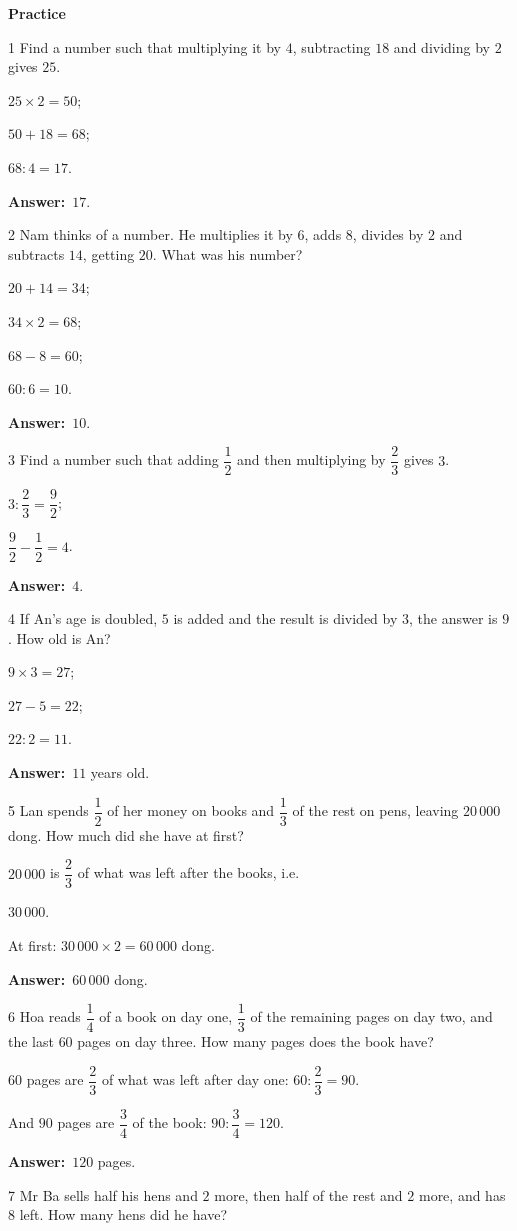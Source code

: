 \documentclass[11pt]{article}
\newif\ifsol \solfalse
\providecommand{\AnsWord}{Đáp số}
\newcommand{\dapso}[1]{\par\textbf{\AnsWord:}\ #1}
\newcommand{\probsol}[1]{%
  \begin{lrbox}{\solmeasure}\begin{minipage}{\dimexpr\linewidth-24pt\relax}#1\end{minipage}\end{lrbox}%
  \ifsol
    \begin{solbox}#1\end{solbox}%
  \else
    \setlength{\solht}{\dimexpr\ht\solmeasure+\dp\solmeasure+0.85cm\relax}%
    \ifdim\solht<1.35cm\setlength{\solht}{1.35cm}\fi
    \begin{tcolorbox}[colback=white,colframe=Line,boxrule=0.8pt,arc=5pt,
      left=8pt,right=8pt,top=4pt,bottom=4pt,height=\solht]{\footnotesize\color{Slate}\itshape\WorkWord}\end{tcolorbox}%
  \fi}
\newcommand{\dividerbar}[1]{\par\vspace{0.6em}\noindent
  \begin{tcolorbox}[enhanced,frame hidden,interior hidden,borderline west={5pt}{0pt}{ProbBlue},
    colback=white,left=12pt,right=12pt,top=5pt,bottom=5pt,arc=4pt]
  {\large\bfseries\color{ProbBlue} #1}\end{tcolorbox}\vspace{0.4em}}
\newcommand{\gap}{\vspace{0.3cm}}
\def\WorkWord{Your work:}
\def\AnsWord{Answer}
\begin{document}
\dividerbar{Practice}
\begin{probbox}{1}{\relax}
Find a number such that multiplying it by $4$, subtracting $18$ and dividing by $2$ gives $25$.
\end{probbox}
\probsol{
$25\times2=50$;\par $50+18=68$;\par $68:4=17$.
\dapso{$17$.}}
\gap
\begin{probbox}{2}{\relax}
Nam thinks of a number. He multiplies it by $6$, adds $8$, divides by $2$ and subtracts $14$, getting $20$. What was his number?
\end{probbox}
\probsol{
$20+14=34$;\par $34\times2=68$;\par $68-8=60$;\par $60:6=10$.
\dapso{$10$.}}
\gap
\begin{probbox}{3}{\relax}
Find a number such that adding $\dfrac12$ and then multiplying by $\dfrac23$ gives $3$.
\end{probbox}
\probsol{
$3:\dfrac23=\dfrac92$;\par $\dfrac92-\dfrac12=4$.
\dapso{$4$.}}
\gap
\begin{probbox}{4}{\relax}
If An's age is doubled, $5$ is added and the result is divided by $3$, the answer is $9$. How old is An?
\end{probbox}
\probsol{
$9\times3=27$;\par $27-5=22$;\par $22:2=11$.
\dapso{$11$ years old.}}
\gap
\begin{probbox}{5}{\relax}
Lan spends $\dfrac12$ of her money on books and $\dfrac13$ of the rest on pens, leaving $20\,000$ dong. How much did she have at first?
\end{probbox}
\probsol{
$20\,000$ is $\dfrac23$ of what was left after the books, i.e.\par $30\,000$.\par At first: $30\,000\times2=60\,000$ dong.
\dapso{$60\,000$ dong.}}
\gap
\begin{probbox}{6}{\relax}
Hoa reads $\dfrac14$ of a book on day one, $\dfrac13$ of the remaining pages on day two, and the last $60$ pages on day three. How many pages does the book have?
\end{probbox}
\probsol{
$60$ pages are $\dfrac23$ of what was left after day one: $60:\dfrac23=90$.\par And $90$ pages are $\dfrac34$ of the book: $90:\dfrac34=120$.
\dapso{$120$ pages.}}
\gap
\begin{probbox}{7}{\relax}
Mr Ba sells half his hens and $2$ more, then half of the rest and $2$ more, and has $8$ left. How many hens did he have?
\end{probbox}
\end{document}

